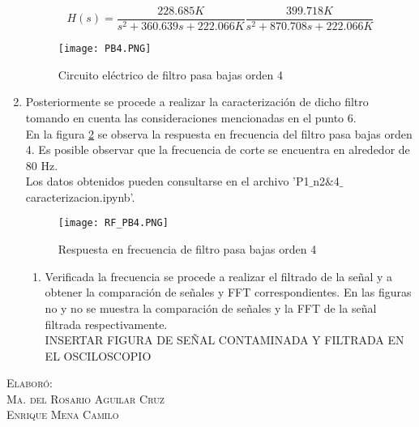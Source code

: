 \documentclass[10pt,letterpaper,spanish,twoside]{report}
\begin{document}
\begin{enumerate}
 \begin{equation}
 	H(s)=\frac{228.685K}{s^2+360.639s+222.066K} \frac{399.718K}{s^2+870.708s+222.066K}\label{FT_n4}
 \end{equation}
 \begin{figure}[H]
 	\centering
 	\texttt{[image: PB4.PNG]}
 	\caption{Circuito eléctrico de filtro pasa bajas orden 4}
	\label{contexto:PB4}
 \end{figure}
 \item Posteriormente se procede a realizar la caracterización de dicho filtro tomando en cuenta las consideraciones mencionadas en el punto 6.
 \\ En la figura \ref{contexto:RF_4} se observa la respuesta en frecuencia del filtro pasa bajas orden 4. Es posible observar que la frecuencia de corte se encuentra en alrededor de 80 Hz.
 \\Los datos obtenidos pueden consultarse en el archivo 'P1$\_$n2$\&$4$\_$caracterizacion.ipynb'.
 \begin{figure}[H]
 	\centering
 	\texttt{[image: RF\_PB4.PNG]}
 	\caption{Respuesta en frecuencia de filtro pasa bajas orden 4}
	\label{contexto:RF_4}
 \end{figure}
 \begin{enumerate}
 \item Verificada la frecuencia se procede a realizar el filtrado de la señal y a obtener la comparación de señales y FFT correspondientes. En las figuras no y no se muestra la comparación de señales y la FFT de la señal filtrada respectivamente.
 \\INSERTAR FIGURA DE SEÑAL CONTAMINADA Y FILTRADA EN EL OSCILOSCOPIO
 \end{enumerate}
\end{enumerate}


\vfill
\begin{flushright}
\textsc{Elaboró:\\
Ma. del Rosario Aguilar Cruz\\
Enrique Mena Camilo}
\end{flushright}
\end{document}
